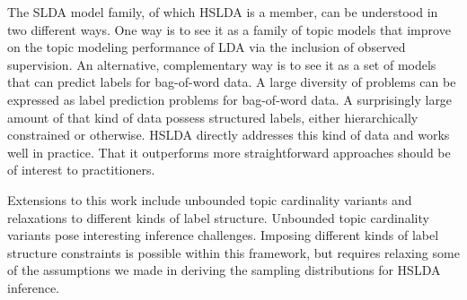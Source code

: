 
The SLDA model family, of which HSLDA is a member, can be understood in two
different ways. One way is to see it as a family of topic models that improve
on the topic modeling performance of LDA via the inclusion of observed
supervision. An alternative, complementary way is to see it as a set of models
that can predict labels for bag-of-word data. A large diversity of problems
can be expressed as label prediction problems for bag-of-word data. A
surprisingly large amount of that kind of data possess structured labels,
either hierarchically constrained or otherwise.  HSLDA directly addresses
this kind of data and works well in practice. That it
outperforms more straightforward approaches should be of interest to
practitioners.
%
%

Extensions to this work include unbounded topic cardinality variants and
relaxations to different kinds of label structure.  Unbounded topic cardinality
variants pose interesting inference challenges.  Imposing different kinds of
label structure constraints is possible within this framework, but requires relaxing some
of the assumptions we made in deriving the sampling distributions for HSLDA inference.

